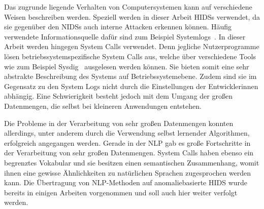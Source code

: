 

%


Das zugrunde liegende Verhalten von Computersystemen kann auf verschiedene Weisen beschreiben werden.
Speziell werden in dieser Arbeit \acfp{HIDS} verwendet, da sie gegenüber den \acp{NIDS} auch interne Attacken erkennen können.
Häufig verwendete Informationsquelle dafür sind zum Beispiel Systemlogs~\cite{HE}.
In dieser Arbeit werden hingegen System Calls verwendet.
Denn jegliche Nutzerprogramme lösen betriebssystemspezifische System Calls aus, welche über verschiedene Tools wie zum Beispiel Sysdig~\cite{SYSDIG} ausgelesen werden können.
Sie bieten somit eine sehr abstrakte Beschreibung des Systems auf Betriebssystemebene.
Zudem sind sie im Gegensatz zu den System Logs nicht durch die Einstellungen der Entwicklerinnen abhängig.
Eine Schwierigkeit besteht jedoch mit dem Umgang der großen Datenmengen, die selbst bei kleineren Anwendungen entstehen.

Die Probleme in der Verarbeitung von sehr großen Datenmengen konnten allerdings, unter anderem durch die Verwendung selbst lernender Algorithmen, erfolgreich angegangen werden.
Gerade in der \acf{NLP} gab es große Fortschritte in der Verarbeitung von sehr großen Datenmengen.
System Calls haben ebenso ein begrenztes Vokabular und sie besitzen einen semantischen Zusammenhang, womit ihnen eine gewisse Ähnlichkeiten zu natürlichen Sprachen zugesprochen werden kann.
Die Übertragung von \ac{NLP}-Methoden auf anomaliebasierte \ac{HIDS} wurde bereits in einigen Arbeiten vorgenommen und soll auch hier weiter verfolgt werden.

